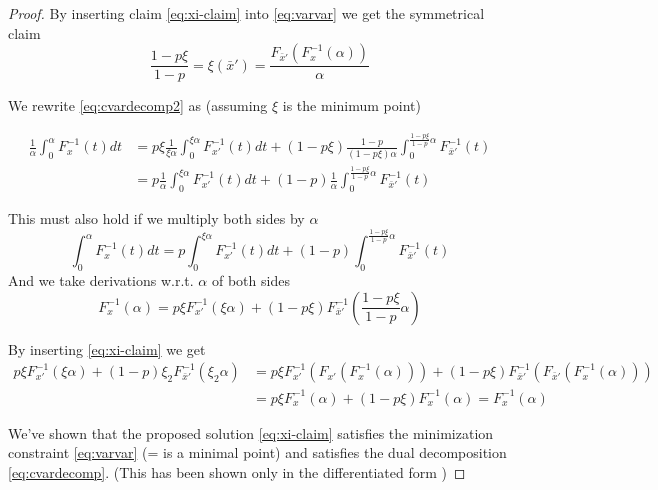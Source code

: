 \begin{proof}
By inserting claim \ref{eq:xi-claim} into \ref{eq:varvar} we get the symmetrical claim
\begin{equation}
\dfrac{1-p\xi}{1-p} = \xi(\bar{x}') = \dfrac{F_{\bar{x}'}(F^{-1}_x(\alpha))}{\alpha}
\end{equation}

We rewrite \ref{eq:cvardecomp2} as (assuming $\xi$ is the minimum point)

\begin{equation}
\begin{split}
\frac{1}{\alpha} \int_0^\alpha F^{-1}_{x}(t)dt &= p\xi \frac{1}{\xi\alpha} \int_0^{\xi\alpha} F^{-1}_{x'}(t)dt + (1-p\xi)\frac{1-p}{(1-p\xi)\alpha} \int_0^{\frac{1-p\xi}{1-p}\alpha} F^{-1}_{\bar{x}'}(t)\\
&=p \frac{1}{\alpha} \int_0^{\xi\alpha} F^{-1}_{x'}(t)dt + (1-p)\frac{1}{\alpha} \int_0^{\frac{1-p\xi}{1-p}\alpha} F^{-1}_{\bar{x}'}(t)
\end{split}
\end{equation}

This must also hold if we multiply both sides by $\alpha$
\begin{equation}
\int_0^\alpha F^{-1}_{x}(t)dt = p\int_0^{\xi\alpha} F^{-1}_{x'}(t)dt + (1-p)\int_0^{\frac{1-p\xi}{1-p}\alpha} F^{-1}_{\bar{x}'}(t)
\end{equation}
And we take derivations w.r.t. $\alpha$ of both sides
\begin{equation}
F^{-1}_{x}(\alpha) = p\xi F^{-1}_{x'}(\xi\alpha) + (1-p\xi) F^{-1}_{\bar{x}'}(\frac{1-p\xi}{1-p}\alpha)
\end{equation}


By inserting \ref{eq:xi-claim} we get
\begin{equation}
\begin{split}
 p\xi F_{x'}^{-1}(\xi\alpha) + (1-p)\xi_2 F_{\bar{x}'}^{-1}\left(\xi_2\alpha\right) &= p\xi F_{x'}^{-1}(F_{x'}(F^{-1}_x(\alpha))) + (1-p\xi) F_{\bar{x}'}^{-1}\left(F_{\bar{x}'}(F^{-1}_x(\alpha))\right)\\
 &= p\xi F_x^{-1}(\alpha) + (1-p\xi)F_x^{-1}(\alpha) = F_x^{-1}(\alpha)
\end{split}
\end{equation}

We've shown that the proposed solution \ref{eq:xi-claim} satisfies the minimization constraint \ref{eq:varvar} (= is a minimal point) and satisfies the dual decomposition \ref{eq:cvardecomp}. (This has been shown only in the differentiated form )

\end{proof}

